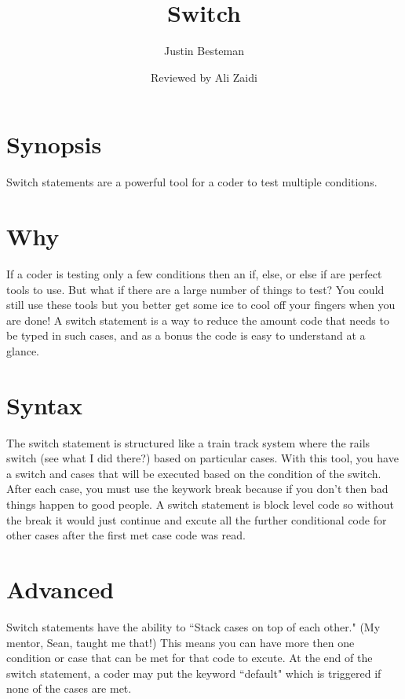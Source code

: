 \documentclass[12pt, letterpaper]{article}
\title{Switch}
\author{Justin Besteman}
\date{Reviewed by Ali Zaidi}
\begin{document}
\maketitle


\section*{Synopsis}

Switch statements are a powerful tool for a coder to test multiple conditions.

\section*{Why}

If a coder is testing only a few conditions then an if, else, or else if are perfect tools to use. But what if there are a large number of things to test? You could still use these tools but you better get some ice to cool off your fingers when you are done! A switch statement is a way to reduce the amount code that needs to be typed in such cases, and as a bonus the code is easy to understand at a glance.

\section*{Syntax}

The switch statement is structured like a train track system where the rails switch (see what I did there?) based on particular cases. With this tool, you have a switch and cases that will be executed based on the condition of the switch. After each case, you must use the keywork break because if you don't then bad things happen to good people. A switch statement is block level code so without the break it would just continue and excute all the further conditional code for other cases after the first met case code was read.

\section*{Advanced}

Switch statements have the ability to ``Stack cases on top of each other." (My mentor, Sean, taught me that!) This means you can have more then one condition or case that can be met for that code to excute. At the end of the switch statement, a coder may put the keyword ``default" which is triggered if none of the cases are met. 
\end{document}
